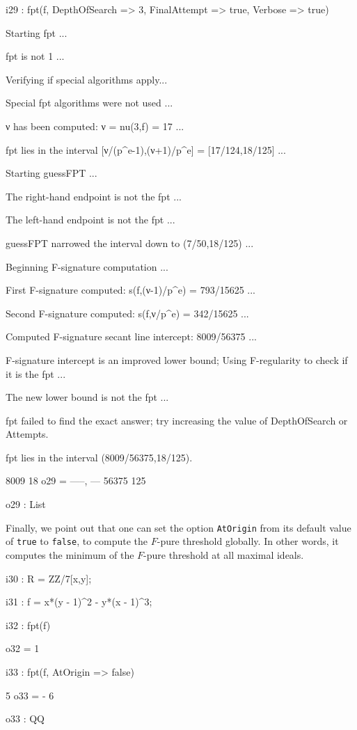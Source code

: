 \documentclass{amsart}
\begin{document}
\smallskip
{\small
{}
\begin{MyVerbatim}
i29 : fpt(f, DepthOfSearch => 3, FinalAttempt => true, Verbose => true)

Starting fpt ...

fpt is not 1 ...

Verifying if special algorithms apply...

Special fpt algorithms were not used ...

ν has been computed: ν = nu(3,f) = 17 ...

fpt lies in the interval [ν/(p^e-1),(ν+1)/p^e] = [17/124,18/125] ...

Starting guessFPT ...

The right-hand endpoint is not the fpt ...

The left-hand endpoint is not the fpt ...

guessFPT narrowed the interval down to (7/50,18/125) ...

Beginning F-signature computation ...

First F-signature computed: s(f,(ν-1)/p^e) = 793/15625 ...

Second F-signature computed: s(f,ν/p^e) = 342/15625 ...

Computed F-signature secant line intercept: 8009/56375 ...

F-signature intercept is an improved lower bound;
Using F-regularity to check if it is the fpt ...

The new lower bound is not the fpt ...

fpt failed to find the exact answer; try increasing the value of
    DepthOfSearch or Attempts.

fpt lies in the interval (8009/56375,18/125).

        8009   18
o29 = {-----, ---}
       56375  125

o29 : List
\end{MyVerbatim}
}
\smallskip

Finally, we point out that one can set the option \texttt{AtOrigin} from its default value of \texttt{true} to \texttt{false}, to compute the $F$-pure threshold globally. In other words, it computes the minimum of the $F$-pure threshold at all maximal ideals.

\smallskip
{\small
{}
\begin{MyVerbatim}
i30 : R = ZZ/7[x,y];

i31 : f = x*(y - 1)^2 - y*(x - 1)^3;

i32 : fpt(f)

o32 = 1

i33 : fpt(f, AtOrigin => false)

      5
o33 = -
      6

o33 : QQ
\end{MyVerbatim}
}
\smallskip
\end{document}
